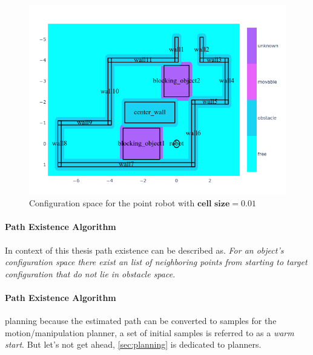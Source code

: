 \begin{figure}[H]
  \centering
  \includegraphics[width=1.0\textwidth, height=0.8\textwidth]{figures/planning/c_space_point_robot_grid_size_0_01}
  \caption{Configuration space for the point robot with $\textbf{cell size} = 0.01$}%
  \label{fig:c_space_point_robot_small}
\end{figure}




\paragraph{Path Existence Algorithm}
In context of this thesis path existence can be described as. \textit{For an object's configuration space there exist an list of neighboring points from starting to target configuration that do not lie in obstacle space.\bs}



\paragraph{Path Existence Algorithm}


planning because the estimated path can be converted to samples for the motion/manipulation planner, a set of initial samples is referred to as a \textit{warm start}. But let's not get ahead, \cref{sec:planning} is dedicated to planners.\bs
{}


